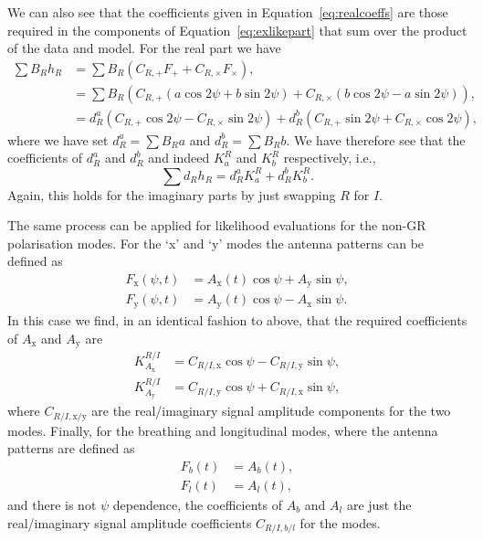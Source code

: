 We can also see that the coefficients given in Equation~\ref{eq:realcoeffs} are those required in the components of
Equation~\ref{eq:exlikepart} that sum over the product of the data and model. For the real part we have
\begin{align}
\sum B_Rh_R &= \sum B_R\left(C_{R,+}F_+ + C_{R,\times}F_{\times} \right), \nonumber \\
 &=\sum B_R\left( C_{R,+}\left(a\cos{2\psi}+b\sin{2\psi}\right) + C_{R,\times}\left(b\cos{2\psi} - a\sin{2\psi} \right) \right), \nonumber \\
 &= d^a_R\left(C_{R,+}\cos{2\psi} - C_{R,\times}\sin{2\psi}\right) + d^b_R\left(C_{R,+}\sin{2\psi} + C_{R,\times}\cos{2\psi} \right),
\end{align}
where we have set $d^a_R = \sum B_R a$ and $d^b_R = \sum B_R b$. We have therefore see that the coefficients
of $d^a_R$ and $d^b_R$ and indeed $K_a^R$ and $K_b^R$ respectively, i.e.,
\begin{equation}
\sum d_Rh_R = d^a_RK_a^R + d^b_RK_b^R.
\end{equation}
Again, this holds for the imaginary parts by just swapping $R$ for $I$.

The same process can be applied for likelihood evaluations for the non-GR polarisation modes. For the `x' and `y'
modes the antenna patterns can be defined as \citep[Equations~32 and 33 of][]{2015PhRvD..91h2002I}
\begin{align}
F_{\text{x}}(\psi,t) &= A_{\text{x}}(t)\cos{\psi} + A_{\text{y}}\sin{\psi}, \nonumber \\
F_{\text{y}}(\psi,t) &= A_{\text{y}}(t)\cos{\psi} - A_{\text{x}}\sin{\psi}.
\end{align}
In this case we find, in an identical fashion to above, that the required coefficients of $A_{\text{x}}$ and $A_{\text{y}}$ are
\begin{align}\label{eq:realcoeffsxy}
K_{A_{\text{x}}}^{R/I} &= C_{R/I,\text{x}}\cos{\psi} - C_{R/I,\text{y}}\sin{\psi}, \nonumber \\
K_{A_{\text{y}}}^{R/I} &= C_{R/I,\text{y}}\cos{\psi} + C_{R/I,\text{x}}\sin{\psi},
\end{align}
where $C_{R/I,\text{x}/\text{y}}$ are the real/imaginary signal amplitude components for the two modes.
Finally, for the breathing and longitudinal modes, where the antenna patterns are defined as \citep[Equations~34 and 35 of][]{2015PhRvD..91h2002I}
\begin{align}
F_{b}(t) &= A_{b}(t), \nonumber \\
F_{l}(t) &= A_{l}(t),
\end{align}
and there is not $\psi$ dependence, the coefficients of $A_{b}$ and $A_l$ are just the real/imaginary signal amplitude coefficients $C_{R/I,b/l}$ for the modes.